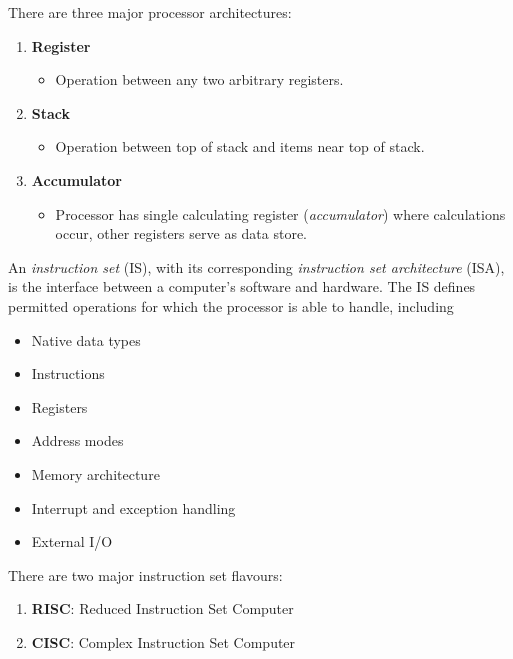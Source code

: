 \begin{definition}
    There are three major processor architectures:
    \begin{enumerate}
        \item \textbf{Register}
        \begin{itemize}
            \item Operation between any two arbitrary registers.
        \end{itemize}
        \item \textbf{Stack}
        \begin{itemize}
            \item Operation between top of stack and items near top of stack.
        \end{itemize}
        \item \textbf{Accumulator}
        \begin{itemize}
            \item Processor has single calculating register (\textit{accumulator}) where calculations occur, other registers serve as data store.
        \end{itemize}
    \end{enumerate}
\end{definition}

\begin{definition}
    An \textit{instruction set} (IS), with its corresponding \textit{instruction set architecture} (ISA), is the interface between a computer's software and hardware. The IS defines permitted operations for which the processor is able to handle, including
    \begin{itemize}
        \item Native data types
        \item Instructions
        \item Registers
        \item Address modes
        \item Memory architecture
        \item Interrupt and exception handling
        \item External I/O
    \end{itemize}
    
    There are two major instruction set flavours:
    \begin{enumerate}
        \item \textbf{RISC}: Reduced Instruction Set Computer
        \item \textbf{CISC}: Complex Instruction Set Computer
    \end{enumerate}
\end{definition}

